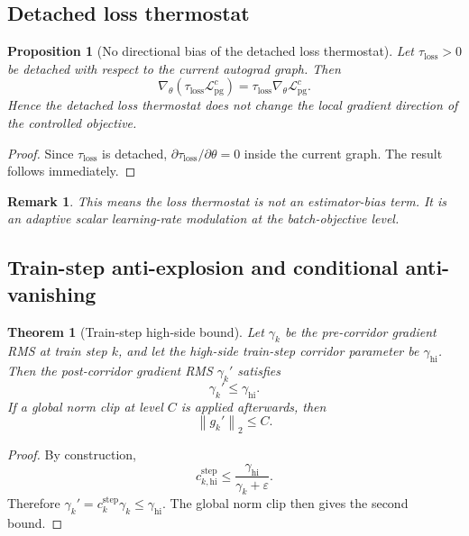 \documentclass[11pt]{article}
\newtheorem{theorem}{Theorem}
\newtheorem{proposition}{Proposition}
\newtheorem{remark}{Remark}
\newcommand{\1}{\mathbf{1}}
\newcommand{\norm}[1]{\left\lVert #1 \right\rVert}
\begin{document}
\subsection{Detached loss thermostat}
\begin{proposition}[No directional bias of the detached loss thermostat]
Let $\tau_{\mathrm{loss}} > 0$ be detached with respect to the current autograd graph. Then
\begin{equation}
  \nabla_{\theta}\!\left(\tau_{\mathrm{loss}} \mathcal{L}_{\mathrm{pg}}^{c}\right)
  =
  \tau_{\mathrm{loss}} \nabla_{\theta}\mathcal{L}_{\mathrm{pg}}^{c}.
\end{equation}
Hence the detached loss thermostat does not change the local gradient direction of the controlled objective.
\end{proposition}

\begin{proof}
Since $\tau_{\mathrm{loss}}$ is detached, $\partial \tau_{\mathrm{loss}} / \partial \theta = 0$ inside the current graph. The result follows immediately.
\end{proof}

\begin{remark}
This means the loss thermostat is not an estimator-bias term. It is an adaptive scalar learning-rate modulation at the batch-objective level.
\end{remark}

\subsection{Train-step anti-explosion and conditional anti-vanishing}
\begin{theorem}[Train-step high-side bound]
Let $\gamma_k$ be the pre-corridor gradient RMS at train step $k$, and let the high-side train-step corridor parameter be $\gamma_{\mathrm{hi}}$. Then the post-corridor gradient RMS $\gamma_k'$ satisfies
\begin{equation}
  \gamma_k' \le \gamma_{\mathrm{hi}}.
\end{equation}
If a global norm clip at level $C$ is applied afterwards, then
\begin{equation}
  \norm{g_k'}_2 \le C.
\end{equation}
\end{theorem}

\begin{proof}
By construction,
\[
  c_{k,\mathrm{hi}}^{\mathrm{step}} \le \frac{\gamma_{\mathrm{hi}}}{\gamma_k + \varepsilon}.
\]
Therefore $\gamma_k' = c_k^{\mathrm{step}}\gamma_k \le \gamma_{\mathrm{hi}}$. The global norm clip then gives the second bound.
\end{proof}
\end{document}
